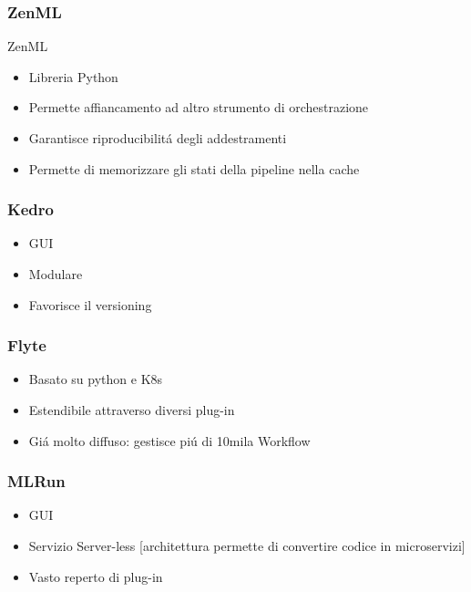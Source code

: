 \documentclass[xcolor=dvipsnames]{beamer}
\begin{document}
\begin{frame}
    \frametitle{ZenML}
        
   ZenML
    \begin{itemize}
        \item Libreria Python
        \item Permette affiancamento ad altro strumento di orchestrazione
        \item Garantisce riproducibilitá degli addestramenti
        \item Permette di memorizzare gli stati della pipeline nella cache %
    \end{itemize}
\end{frame}

\begin{frame}
    \frametitle{Kedro}

    \begin{itemize}
        \item GUI
        \item Modulare
        \item Favorisce il versioning
    \end{itemize}
    
\end{frame}

\begin{frame}
    \frametitle{Flyte}
\begin{itemize}
    \item Basato su python e K8s
    \item Estendibile attraverso diversi plug-in
    \item Giá molto diffuso: gestisce piú di 10mila Workflow
\end{itemize}
    

\end{frame}

\begin{frame}
    \frametitle{MLRun}
    \begin{itemize}
        \item GUI 
        \item Servizio Server-less [architettura permette di convertire codice in microservizi]
        \item Vasto reperto di plug-in
    \end{itemize}
    

\end{frame}
\end{document}
